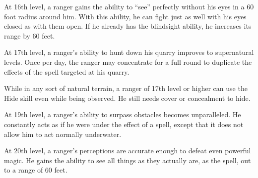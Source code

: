  At 16th level, a ranger gains the ability to ``see'' perfectly without his eyes in a 60 foot radius around him. With this ability, he can fight just as well with his eyes closed as with them open. If he already has the blindsight ability, he increases its range by 60 feet.

 At 17th level, a ranger's ability to hunt down his quarry improves to supernatural levels. Once per day, the ranger may concentrate for a full round to duplicate the effects of the  spell targeted at his quarry.

 While in any sort of natural terrain, a ranger of 17th level or higher can use the Hide skill even while being observed. He still needs cover or concealment to hide.

 At 19th level, a ranger's ability to surpass obstacles becomes unparalleled. He constantly acts as if he were under the effect of a  spell, except that it does not allow him to act normally underwater.

 At 20th level, a ranger's perceptions are accurate enough to defeat even powerful magic. He gains the ability to see all things as they actually are, as the  spell, out to a range of 60 feet.


